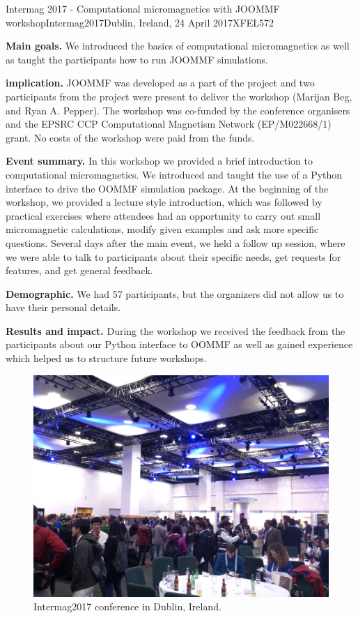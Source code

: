 \begin{event}{Intermag 2017 - Computational micromagnetics with JOOMMF workshop}{Intermag2017}{Dublin, Ireland, 24 April 2017}{XFEL}{57}{2}{}

\textbf{Main goals.} We introduced the basics of computational micromagnetics as well as taught the participants how to run JOOMMF simulations.

\textbf{\ODK implication.} JOOMMF was developed as a part of the \ODK project and two participants from the \ODK project were present to deliver the workshop (Marijan Beg, and Ryan A. Pepper). The workshop was co-funded by the conference organisers and the EPSRC CCP Computational Magnetism Network (EP/M022668/1) grant. No costs of the workshop were paid from the \ODK funds.

\textbf{Event summary.} In this workshop we provided a brief introduction to computational micromagnetics. We introduced and taught the use of a Python interface to drive the OOMMF simulation package. At the beginning of the workshop, we provided a lecture style introduction, which was followed by practical exercises where attendees had an opportunity to carry out small micromagnetic calculations, modify given examples and ask more specific questions. Several days after the main event, we held a follow up session, where we were able to talk to participants about their specific needs, get requests for features, and get general feedback.

\textbf{Demographic.} We had 57 participants, but the organizers did not allow us to have their personal details.

\textbf{Results and impact.} During the workshop we received the feedback from the participants about our Python interface to OOMMF as well as gained experience which helped us to structure future workshops.

\begin{figure}[ht]
\includegraphics[scale=.1]{IntermagPhoto1.jpg}
\caption*{Intermag2017 conference in Dublin, Ireland.}
\end{figure}


\end{event}
